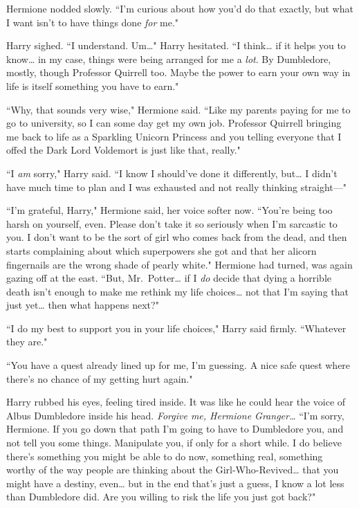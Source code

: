 Hermione nodded slowly. ``I'm curious about how you'd do that exactly, but what I want isn't to have things done \emph{for} me."

Harry sighed. ``I understand. Um{\ldots}" Harry hesitated. ``I think{\ldots} if it helps you to know{\ldots} in my case, things were being arranged for me a \emph{lot}. By Dumbledore, mostly, though Professor Quirrell too. Maybe the power to earn your own way in life is itself something you have to earn."

``Why, that sounds very wise," Hermione said. ``Like my parents paying for me to go to university, so I can some day get my own job. Professor Quirrell bringing me back to life as a Sparkling Unicorn Princess and you telling everyone that I offed the Dark Lord Voldemort is just like that, really."

``I \emph{am} sorry," Harry said. ``I know I should've done it differently, but{\ldots} I didn't have much time to plan and I was exhausted and not really thinking straight---"

``I'm grateful, Harry," Hermione said, her voice softer now. ``You're being too harsh on yourself, even. Please don't take it so seriously when I'm sarcastic to you. I don't want to be the sort of girl who comes back from the dead, and then starts complaining about which superpowers she got and that her alicorn fingernails are the wrong shade of pearly white." Hermione had turned, was again gazing off at the east. ``But, Mr.~Potter{\ldots} if I \emph{do} decide that dying a horrible death isn't enough to make me rethink my life choices{\ldots} not that I'm saying that just yet{\ldots} then what happens next?"

``I do my best to support you in your life choices," Harry said firmly. ``Whatever they are."

``You have a quest already lined up for me, I'm guessing. A nice safe quest where there's no chance of my getting hurt again."

Harry rubbed his eyes, feeling tired inside. It was like he could hear the voice of Albus Dumbledore inside his head. \emph{Forgive me, Hermione Granger{\ldots}} ``I'm sorry, Hermione. If you go down that path I'm going to have to Dumbledore you, and not tell you some things. Manipulate you, if only for a short while. I do believe there's something you might be able to do now, something real, something worthy of the way people are thinking about the Girl-Who-Revived{\ldots} that you might have a destiny, even{\ldots} but in the end that's just a guess, I know a lot less than Dumbledore did. Are you willing to risk the life you just got back?"

